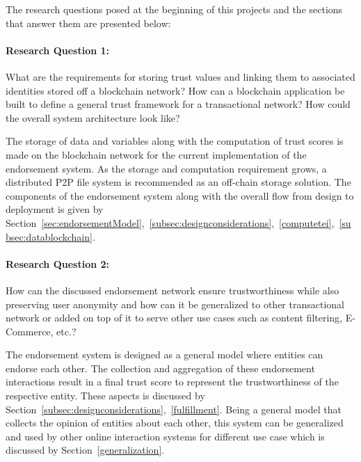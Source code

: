 The research questions posed at the beginning of this projects and the sections
that answer them are presented below:  


\paragraph{Research Question 1:}What are the requirements for storing trust
values and linking them to associated identities stored off a blockchain
network? How can a blockchain application be built to define a general trust
framework for a transactional network? How could the overall system
architecture look like? \par
The storage of data and variables along with the computation of trust scores is
made on the blockchain network for the current implementation of the
endorsement system. As the storage and computation requirement grows, a
distributed P2P file system is recommended as an off-chain storage solution.
The components of the endorsement system along with the overall flow from
design to deployment is given by
Section~\ref{sec:endorsementModel},~\ref{subsec:designconsiderations},~\ref{computetei},~\ref{subsec:datablockchain}.

\paragraph{Research Question 2:}How can the discussed endorsement network
ensure trustworthiness while also preserving user anonymity and how can it be
generalized to other transactional network or added on top of it to serve other
use cases such as content filtering, E-Commerce, etc.? \par
The endorsement system is designed as a general model where entities can
endorse each other. The collection and aggregation of these endorsement
interactions result in a final trust score to represent the trustworthiness of
the respective entity. These aspects is discussed by
Section~\ref{subsec:designconsiderations},~\ref{fulfillment}. Being a general
model that collects the opinion of entities about each other, this system can
be generalized and used by other online interaction systems for different use
case which is discussed by Section~\ref{generalization}.

